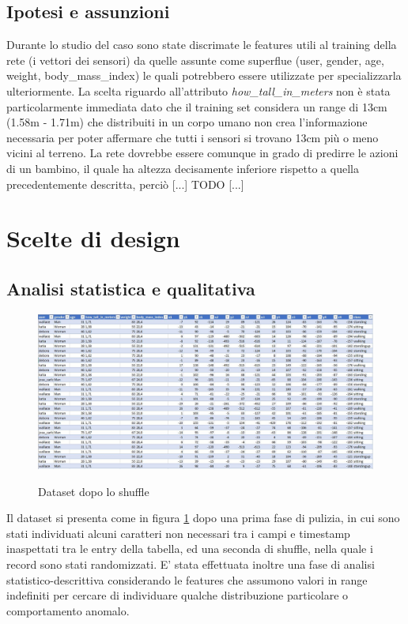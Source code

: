 \documentclass[12pt]{article}
\begin{document}
\subsection{Ipotesi e assunzioni}
Durante lo studio del caso sono state discrimate le features utili al training della rete (i vettori dei sensori) da quelle assunte come superflue (user, gender, age, weight, body\_mass\_index) le quali potrebbero essere utilizzate per specializzarla ulteriormente.\newline
La scelta riguardo all'attributo \emph{how\_tall\_in\_meters} non è stata particolarmente immediata dato che il training set considera un range di 13cm (1.58m - 1.71m) che distribuiti in un corpo umano non crea l'informazione necessaria per poter affermare che tutti i sensori si trovano 13cm più o meno vicini al terreno. La rete dovrebbe essere comunque in grado di predirre le azioni di un bambino, il quale ha altezza decisamente inferiore rispetto a quella precedentemente descritta, perciò [...] TODO [...] 

\section{Scelte di design}
\subsection{Analisi statistica e qualitativa}
\begin{figure}[H]
	\centering
	{\includegraphics[width=1\textwidth]{images/dataset.JPG}}
	\caption{Dataset dopo lo shuffle}
	\label{fig:dataset}
\end{figure}
Il dataset si presenta come in figura \ref{fig:dataset} dopo una prima fase di pulizia, in cui sono stati individuati alcuni caratteri non necessari tra i campi e timestamp inaspettati tra le entry della tabella, ed una seconda di shuffle, nella quale i record sono stati randomizzati.\newline
E' stata effettuata inoltre una fase di analisi statistico-descrittiva considerando le features che assumono valori in range indefiniti per cercare di individuare qualche distribuzione particolare o comportamento anomalo.
\end{document}
